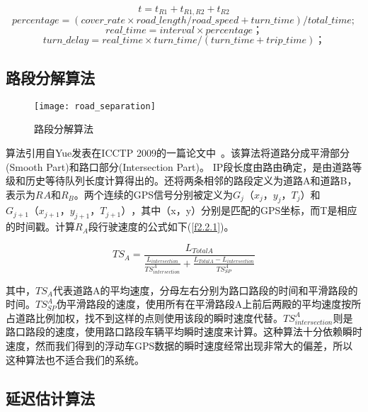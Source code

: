 \begin{equation}
t=t_{R1}+t_{R1,R2}+t_{R2}
\label{f2.1.1}
\end{equation}
\begin{equation}
percentage = (cover\_rate\times road\_length/road\_speed + turn\_time) / total\_time;
\label{f2.1.2}
\end{equation}
\begin{equation}
real\_time = interval\times percentage；
\label{f2.1.3}
\end{equation}
\begin{equation}
turn\_delay = real\_time \times turn\_time/(turn\_time + trip\_time)；
\label{f2.1.4}
\end{equation}

\subsection{路段分解算法}

\begin{figure}[H] 
  \centering
  \texttt{[image: road\_separation]}
  \caption{路段分解算法}
  \label{fig:3}
\end{figure}

算法引用自Yue发表在ICCTP 2009的一篇论文中~\cite{yue2009urban}。该算法将道路分成平滑部分(Smooth Part)和路口部分(Intersection Part)。 IP段长度由路由确定，是由道路等级和历史等待队列长度计算得出的。还将两条相邻的路段定义为道路A和道路B，表示为$R_{}A$和$R_{B}$。两个连续的GPS信号分别被定义为$G_{j}（x_{j}，y_{j}，T_{j}）$和$G_{j + 1}（x_{j + 1}，y_{j + 1}，T_{j + 1}）$，其中（x，y）分别是匹配的GPS坐标，而T是相应的时间戳。计算$R_{A}$段行驶速度的公式如下(\ref{f2.2.1})。

\begin{equation}
TS_{A}=\frac{L_{TotalA}}{\frac{L_{intersection}}{TS_{intersection}^{A}}+\frac{L_{TotalA}-L_{intersection}}{TS_{SP}^{A}}}
\label{f2.2.1}
\end{equation}

其中，$TS_{A}$代表道路A的平均速度，分母左右分别为路口路段的时间和平滑路段的时间。$TS_{SP}^{A}$伪平滑路段的速度，使用所有在平滑路段A上前后两殿的平均速度按所占道路比例加权，找不到这样的点则使用该段的瞬时速度代替。$TS_{intersection}^{A}$则是路口路段的速度，使用路口路段车辆平均瞬时速度来计算。这种算法十分依赖瞬时速度，然而我们得到的浮动车GPS数据的瞬时速度经常出现非常大的偏差，所以这种算法也不适合我们的系统。

\subsection{延迟估计算法}

